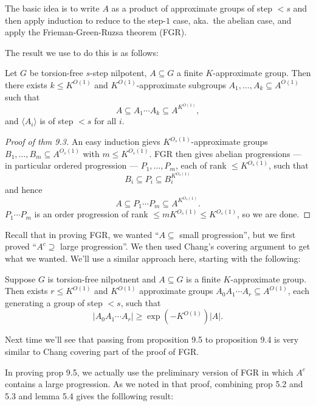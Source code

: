 \documentclass[a4paper]{article}
\begin{document}
The basic idea is to write \(A\) as a product of approximate groups of step \(< s\) and then apply induction to reduce to the step-\(1\) case, aka.\ the abelian case, and apply the Frieman-Green-Ruzsa theorem (FGR).

The result we use to do this is as follows:

\begin{proposition}[prop 9.4]
  Let \(G\) be torsion-free \(s\)-step nilpotent, \(A \subseteq G\) a finite \(K\)-approximate group. Then there exists \(k \leq K^{O(1)}\) and \(K^{O(1)}\)-approximate subgroups \(A_1, \dots, A_k \subseteq A^{O(1)}\) such that
  \[
    A \subseteq A_1 \cdots A_k \subseteq A^{K^{O(1)}},
  \]
  and \(\langle A_i \rangle\) is of step \(< s\) for all \(i\).
\end{proposition}

\begin{proof}[Proof of thm 9.3]
  An easy induction gievs \(K^{O_s(1)}\)-approximate groups \(B_1, \dots, B_m \subseteq A^{O_s(1)}\) with \(m \leq K^{O_s(1)}\). FGR then gives abelian progressions --- in particular ordered progression --- \(P_1, \dots, P_m\), each of rank \(\leq K^{O_s(1)}\), such that
  \[
    B_i \subseteq P_i \subseteq B_i^{K^{O_s(1)}}
  \]
  and hence
  \[
    A \subseteq P_1 \cdots P_m \subseteq A^{K^{O_s(1)}}.
  \]
  \(P_1 \cdots P_m\) is an order progression of rank \(\leq m K^{O_s(1)} \leq K^{O_s(1)}\), so we are done.
\end{proof}

Recall that in proving FGR, we wanted ``\(A \subseteq \) small progression'', but we first proved ``\(A^c \supseteq\) large progression''. We then used Chang's covering argument to get what we wanted. We'll use a similar approach here, starting with the following:

\begin{proposition}[prop 9.5]
  Suppose \(G\) is torsion-free nilpotnent and \(A \subseteq G\) is a finite \(K\)-approximate group. Then exists \(r \leq K^{O(1)}\) and \(K^{O(1)}\) approximate groups \(A_0A_1 \cdots A_r \subseteq A^{O(1)}\), each generating a group of step \(< s\), such that
  \[
    |A_0A_1 \cdots A_r| \geq \exp (-K^{O(1)}) |A|.
  \]
\end{proposition}

Next time we'll see that passing from proposition 9.5 to proposition 9.4 is very similar to Chang covering part of the proof of FGR.

In proving prop 9.5, we actually use the preliminary version of FGR in which \(A^c\) contains a large progression. As we noted in that proof, combining prop 5.2 and 5.3 and lemma 5.4 gives the folllowing result:
\end{document}

